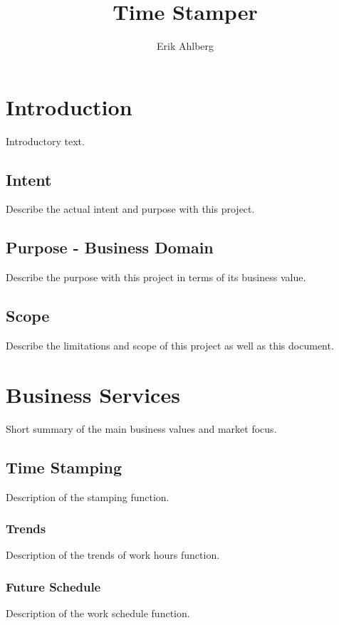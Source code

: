\documentclass{report}
\begin{document}
\title{Time Stamper}
\author{Erik Ahlberg}

\maketitle

\tableofcontents

\newpage

\chapter{Introduction}
Introductory text.

\section{Intent}
Describe the actual intent and purpose with this project.

\section{Purpose - Business Domain}
Describe the purpose with this project in terms of its business value.

\section{Scope}
Describe the limitations and scope of this project as well as this document.

\chapter{Business Services}
Short summary of the main business values and market focus.

\section{Time Stamping}
Description of the stamping function.

\subsection{Trends}
Description of the trends of work hours function.

\subsection{Future Schedule}
Description of the work schedule function.
\end{document}
